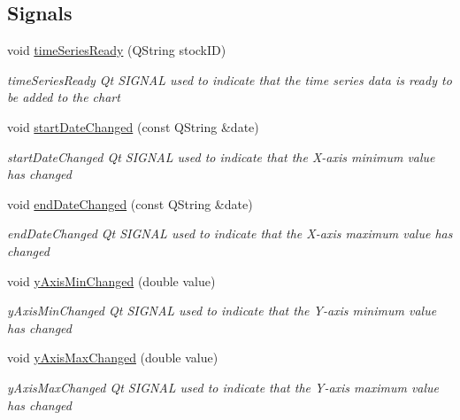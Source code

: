 \subsection*{Signals}
\begin{DoxyCompactItemize}
\item 
void \hyperlink{class_stock_chart_a9065188a2340a471d3db38fdd1763411}{time\+Series\+Ready} (Q\+String stock\+ID)
\begin{DoxyCompactList}\small\item\em time\+Series\+Ready Qt S\+I\+G\+N\+AL used to indicate that the time series data is ready to be added to the chart \end{DoxyCompactList}\item 
void \hyperlink{class_stock_chart_a4f0cf491de4e546621bac94bec52abc2}{start\+Date\+Changed} (const Q\+String \&date)
\begin{DoxyCompactList}\small\item\em start\+Date\+Changed Qt S\+I\+G\+N\+AL used to indicate that the X-\/axis minimum value has changed \end{DoxyCompactList}\item 
void \hyperlink{class_stock_chart_a4f7074ac61cf94ca61eb85d6869846c3}{end\+Date\+Changed} (const Q\+String \&date)
\begin{DoxyCompactList}\small\item\em end\+Date\+Changed Qt S\+I\+G\+N\+AL used to indicate that the X-\/axis maximum value has changed \end{DoxyCompactList}\item 
void \hyperlink{class_stock_chart_aefe9dfa0898e3f4daff97fe6cec674dc}{y\+Axis\+Min\+Changed} (double value)
\begin{DoxyCompactList}\small\item\em y\+Axis\+Min\+Changed Qt S\+I\+G\+N\+AL used to indicate that the Y-\/axis minimum value has changed \end{DoxyCompactList}\item 
void \hyperlink{class_stock_chart_a336420011eff34ae4b5c1afded4873db}{y\+Axis\+Max\+Changed} (double value)
\begin{DoxyCompactList}\small\item\em y\+Axis\+Max\+Changed Qt S\+I\+G\+N\+AL used to indicate that the Y-\/axis maximum value has changed \end{DoxyCompactList}\end{DoxyCompactItemize}
